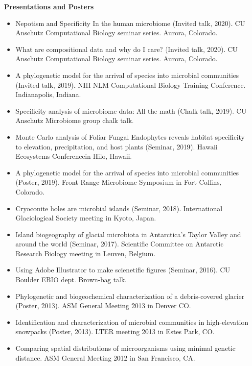 \documentclass{article}
\begin{document}
\vspace{3mm}
{\large  \textbf{Presentations and Posters}}
\begin{itemize}[noitemsep,topsep=0pt, leftmargin=5mm]
  \item Nepotism and Specificity In the human microbiome (Invited talk, 2020). CU Anschutz Computational Biology seminar series. Aurora, Colorado.
  \item What are compositional data and why do I care? (Invited talk, 2020). CU Anschutz Computational Biology seminar series. Aurora, Colorado.
  \item A phylogenetic model for the arrival of species into microbial communities (Invited talk, 2019). NIH NLM Computational Biology Training Conference. Indianapolis, Indiana.
  \item Specificity analysis of microbiome data: All the math (Chalk talk, 2019). CU Anschutz Microbiome group chalk talk.
  \item Monte Carlo analysis of Foliar Fungal Endophytes reveals habitat specificity to elevation, precipitation, and host plants (Seminar, 2019). Hawaii Ecosystems Conferencein  Hilo, Hawaii.
  \item A phylogenetic model for the arrival of species into microbial communities (Poster, 2019). Front Range Microbiome Symposium in Fort Collins, Colorado.
  \item Cryoconite holes are microbial islands (Seminar, 2018). International Glaciological Society meeting in Kyoto, Japan.
  \item Island biogeography of glacial microbiota in Antarctica’s Taylor Valley and around the world (Seminar, 2017). Scientific Committee on Antarctic Research Biology meeting in Leuven, Belgium.
  \item Using Adobe Illustrator to make scienetific figures (Seminar, 2016). CU Boulder EBIO dept. Brown-bag talk.
  \item Phylogenetic and biogeochemical characterization of a debris-covered glacier (Poster, 2013). ASM General Meeting 2013 in Denver CO.
  \item Identification and characterization of microbial communities in high-elevation snowpacks (Poster, 2013). LTER meeting 2013 in Estes Park, CO.
  \item Comparing spatial distributions of microorganisms using minimal genetic distance. ASM General Meeting 2012 in San Francisco, CA.
\end{itemize}

\pagebreak
\end{document}
